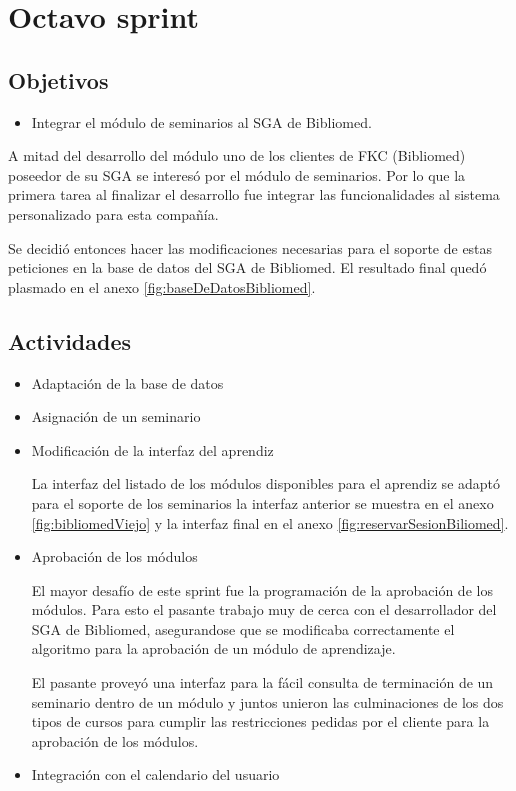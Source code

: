 ﻿\section{Octavo sprint} %
\label{sec:octavo_sprint}

\subsection{Objetivos}

\begin{itemize}
	\item Integrar el módulo de seminarios al SGA de Bibliomed.
\end{itemize}

A mitad del desarrollo del módulo uno de los clientes de FKC (Bibliomed) poseedor de su SGA se interesó por el módulo de seminarios. Por lo que la primera tarea al finalizar el desarrollo fue integrar las funcionalidades al sistema personalizado para esta compañía.

Se decidió entonces hacer las modificaciones necesarias para el soporte de estas peticiones en la base de datos del SGA de Bibliomed. El resultado final quedó plasmado en el anexo \ref{fig:baseDeDatosBibliomed}.

\subsection{Actividades} %
\label{sub:actividades8}

\begin{itemize}

\item Adaptación de la base de datos

\item Asignación de un seminario

\item Modificación de la interfaz del aprendiz

La interfaz del listado de los módulos disponibles para el aprendiz se adaptó para el soporte de los seminarios la interfaz anterior se muestra en el anexo \ref{fig:bibliomedViejo} y la interfaz final en el anexo \ref{fig:reservarSesionBiliomed}.

\item Aprobación de los módulos

El mayor desafío de este sprint fue la programación de la aprobación de los módulos. Para esto el pasante trabajo muy de cerca con el desarrollador del SGA de Bibliomed, asegurandose que se modificaba correctamente el algoritmo para la aprobación de un módulo de aprendizaje.

El pasante proveyó una interfaz para la fácil consulta de terminación de un seminario dentro de un módulo y juntos unieron las culminaciones de los dos tipos de cursos para cumplir las restricciones pedidas por el cliente para la aprobación de los módulos.

\item Integración con el calendario del usuario

\end{itemize}


